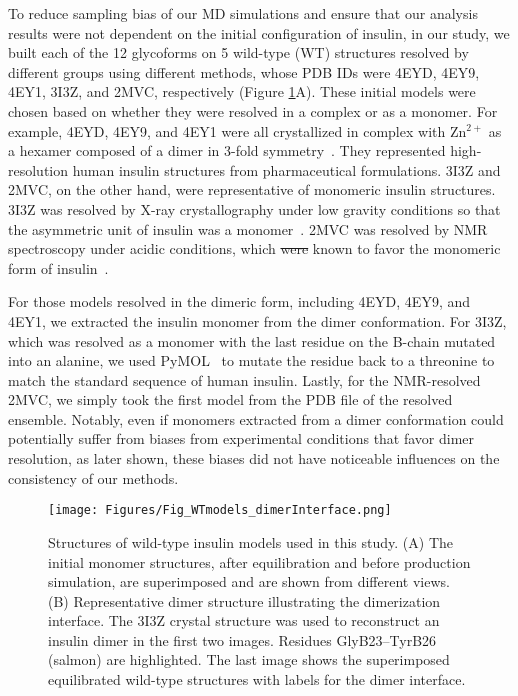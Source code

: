 \documentclass[9pt]{elife}
\providecommand{\DIFaddtex}[1]{{\protect\color{blue}\uwave{#1}}} %
\providecommand{\DIFdeltex}[1]{{\protect\color{red}\sout{#1}}}                      %
\providecommand{\DIFaddbegin}{} %
\providecommand{\DIFaddend}{} %
\providecommand{\DIFdelbegin}{} %
\providecommand{\DIFdelend}{} %
\providecommand{\DIFaddFL}[1]{\DIFadd{#1}} %
\providecommand{\DIFaddbeginFL}{} %
\providecommand{\DIFaddendFL}{} %
\providecommand{\DIFadd}[1]{\texorpdfstring{\DIFaddtex{#1}}{#1}} %
\providecommand{\DIFdel}[1]{\texorpdfstring{\DIFdeltex{#1}}{}} %
\begin{document}
\DIFdelend To reduce sampling bias of our MD simulations and ensure that our analysis results were not dependent on the initial configuration of insulin, in our study, we built each of the 12 glycoforms on 5 wild-type (WT) structures resolved by different groups using different methods, whose PDB IDs were 4EYD, 4EY9, 4EY1, 3I3Z, and 2MVC, respectively (Figure \ref{starting_structures}A). These initial models were chosen based on whether they were resolved in a complex or as a monomer. For example, 4EYD, 4EY9, and 4EY1 were all crystallized in complex with Zn$^{2+}$ as a hexamer composed of a dimer in 3-fold symmetry~\cite{favero2013structural}. They represented high-resolution human insulin structures from pharmaceutical formulations. 3I3Z and 2MVC, on the other hand, were representative of monomeric insulin structures. 3I3Z was resolved by X-ray crystallography under low gravity conditions so that the asymmetric unit of insulin was a monomer~\cite{timofeev2010x}. 2MVC was resolved by NMR spectroscopy under acidic conditions, which \DIFdelbegin \DIFdel{were }\DIFdelend \DIFaddbegin \DIFadd{is }\DIFaddend known to favor the monomeric form of insulin~\cite{kvrivzkova2014structural}.

For those models resolved in the dimeric form, including 4EYD, 4EY9, and 4EY1, we extracted the insulin monomer from the dimer conformation. For 3I3Z, which was resolved as a monomer with the last residue on the B-chain mutated into an alanine, we used PyMOL~\cite{delano2002pymol} to mutate the residue back to a threonine to match the standard sequence of human insulin. Lastly, for the NMR-resolved 2MVC, we simply took the first model from the PDB file of the resolved ensemble. Notably, even if monomers extracted from a dimer conformation could potentially suffer from biases from experimental conditions that favor dimer resolution, as later shown, these biases did not have noticeable influences on the consistency of our methods. 

\begin{figure}[H]
\centering
\texttt{[image: Figures/Fig\_WTmodels\_dimerInterface.png]}
\caption{Structures of wild-type insulin models used in this study. (A) The initial monomer structures, after equilibration and before production simulation, are superimposed and are shown from different views. (B) Representative dimer structure illustrating the dimerization interface. The 3I3Z crystal structure was used to reconstruct an insulin dimer in the first two images. Residues GlyB23--TyrB26 (salmon) are highlighted. The last image shows the superimposed equilibrated wild-type structures with \DIFaddbeginFL \DIFaddFL{residue }\DIFaddendFL labels for the dimer interface.}
\label{starting_structures}
\end{figure}
\end{document}
